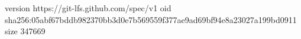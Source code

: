 version https://git-lfs.github.com/spec/v1
oid sha256:05abf67bddb982370bb3d0e7b569559f377ae9ad69bf94e8a23027a199bd0911
size 347669
